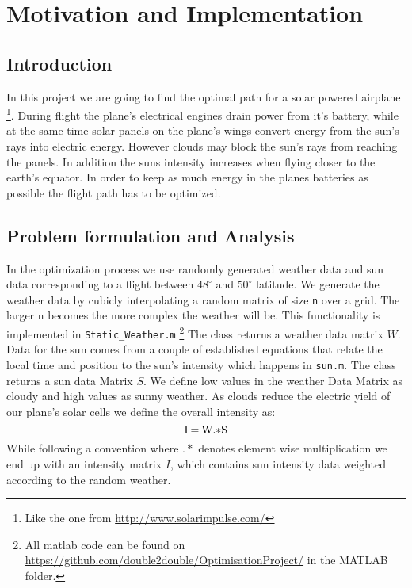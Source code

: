 \documentclass[ twoside,openright,titlepage,numbers=noenddot,headinclude,%
                footinclude=true,cleardoublepage=empty,abstractoff, %
                BCOR=5mm,paper=a4,fontsize=11pt,%
                ngerman,american,%
                ]{scrreprt}
\begin{document}
\frenchspacing
\raggedbottom
{} %
\pagestyle{plain}

%
\pagestyle{scrheadings}



\chapter{Motivation and Implementation}
\section{Introduction}
In this project we are going to find the optimal path for a solar powered airplane \footnote{Like the one from \url{http://www.solarimpulse.com/}}. During flight the plane's electrical engines drain power from it's battery, while at the same time solar panels on the plane's wings convert energy from the sun's rays into electric energy. However clouds may block the sun's rays from reaching the panels. In addition the suns intensity increases when flying closer to the earth's equator. In order to keep as much energy in the planes batteries as possible the flight path has to be optimized.

\section{Problem formulation and Analysis}
In the optimization process we use randomly generated weather data and sun data corresponding to a flight between $48^\circ$ and $50^\circ$ latitude. We generate the weather data by cubicly interpolating a random matrix of size \texttt{n} over a grid. The larger n becomes the more complex the weather will be. This functionality is implemented in \texttt{Static\_Weather.m} \footnote{All matlab code can be found on \url{https://github.com/double2double/OptimisationProject/} in the MATLAB folder.} The class returns a weather data matrix $W$.
Data for the sun comes from a couple of established equations that relate the local time and position to the sun's intensity  which happens in \texttt{sun.m}. The class returns a sun data Matrix $S$. We define low values in the weather Data Matrix as cloudy and high values as sunny weather. As clouds reduce the electric yield of our plane's solar cells we define the overall intensity as:
\begin{equation}
$I$ \:= \: $W$ .* $S$
\end{equation}
While following a convention where $.*$ denotes element wise multiplication we end up with an intensity matrix $I$, which contains sun intensity data weighted according to the random weather.
\end{document}
